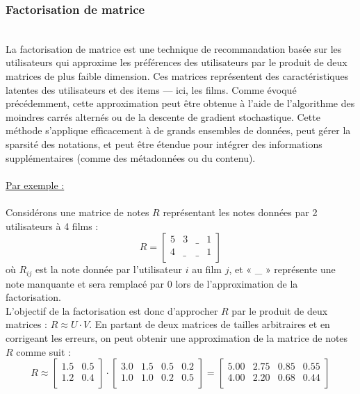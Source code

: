 \documentclass{article}
\begin{document}
\subsubsection{Factorisation de matrice}
$ $\\
La factorisation de matrice \cite{matrix_fac} est une technique de recommandation basée sur 
les utilisateurs qui approxime les préférences des utilisateurs par le produit de deux matrices 
de plus faible dimension. Ces matrices représentent des caractéristiques latentes des utilisateurs 
et des items — ici, les films. Comme évoqué précédemment, cette approximation peut être obtenue à 
l’aide de l’algorithme des moindres carrés alternés ou de la descente de gradient stochastique.
Cette méthode s’applique efficacement à de grands ensembles de données, peut gérer la sparsité des notations, 
et peut être étendue pour intégrer des informations supplémentaires (comme des métadonnées ou du contenu).\\
\\
\underline{Par exemple :}\\
\\
Considérons une matrice de notes \( R \) représentant les notes données par 2 utilisateurs à 4 films :\\
\[
R =
    \begin{bmatrix}
        5 & 3 & \_ & 1 \\
        4 & \_ & \_ & 1 \\
    \end{bmatrix}
\]
où \( R_{ij} \) est la note donnée par l’utilisateur \( i \) au film \( j \), et « \_ » représente une note manquante
et sera remplacé par 0 lors de l'approximation de la factorisation.\\
L’objectif de la factorisation est donc d’approcher \( R \) par le produit de deux matrices : \(R \approx U \cdot V\). 
En partant de deux matrices de tailles arbitraires et en corrigeant les erreurs, on peut obtenir une approximation de 
la matrice de notes \( R \) comme suit :\\
\[
    R \approx
    \begin{bmatrix}
        1.5 & 0.5 \\
        1.2 & 0.4 \\
    \end{bmatrix}
    \cdot
    \begin{bmatrix}
        3.0 & 1.5 & 0.5 & 0.2 \\
        1.0 & 1.0 & 0.2 & 0.5 \\
    \end{bmatrix}
    =
    \begin{bmatrix}
        5.00 & 2.75 & 0.85 & 0.55 \\
        4.00 & 2.20 & 0.68 & 0.44 \\
    \end{bmatrix}
\]
\end{document}
